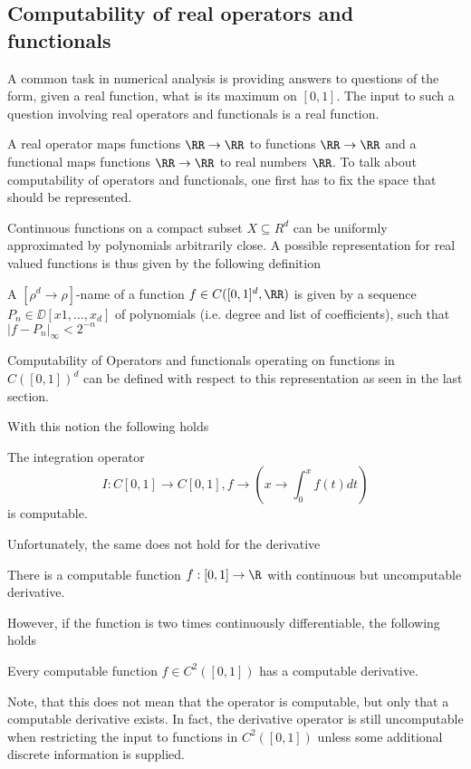 \subsection{Computability of real operators and functionals}
A common task in numerical analysis is providing answers to questions of the
form, given a real function, what is its maximum on $[0,1]$.
The input to such a question involving real operators and functionals is a real function.

A real operator maps functions $\RR \to \RR$ to functions $\RR \to \RR$ and a functional maps functions $\RR \to \RR$ to real numbers $\RR$.
To talk about computability of operators and functionals, one first has to fix
the space that should be represented.

Continuous functions on a compact subset $X \subseteq R^d$ can be uniformly approximated by polynomials arbitrarily close.
A possible representation for real valued functions is thus given by the following definition 
\begin{definition}
A $[\rho^d \to \rho]$-name of a function $f \in C([0,1]^d, \RR)$ is given by a
sequence $P_n \in \DD[x1, \dots, x_d]$ of polynomials (i.e. degree and list of
coefficients), such that $\vert f - P_n \vert_\infty < 2^{-n}$
\end{definition}
Computability of Operators and functionals operating on functions in
$C([0,1])^d$ can be defined with respect to this representation as seen in the
last section.

With this notion the following holds
\begin{theorem}
The integration operator 
$$I: C[0,1] \to C[0,1], f \to \left(x \to \int_0^x f(t) dt\right)$$   
is computable.
\end{theorem}
Unfortunately, the same does not hold for the derivative
\begin{theorem}[Myhill 1971]
There is a computable function $f: [0,1] \to \R$ with continuous but uncomputable derivative. 
\end{theorem}
However, if the function is two times continuously differentiable, the
following holds
\begin{theorem}
  Every computable function $f \in C^2([0,1])$ has a computable derivative.
\end{theorem}
Note, that this does not mean that the operator is computable, but only that
a computable derivative exists. 
In fact, the derivative operator is still uncomputable when restricting the
input to functions in $C^2([0,1])$ unless some additional discrete information
is supplied. 

